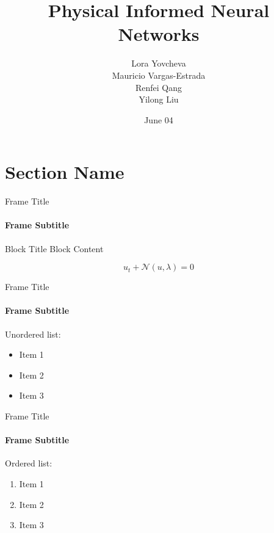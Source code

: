 \documentclass{beamer}
\title{Physical Informed Neural Networks}
\date{June 04}
\author{Lora Yovcheva\\
Mauricio Vargas-Estrada\\
Renfei Qang\\
Yilong Liu}
\begin{document}
\insertTitleSlide

\section{Section Name}

\begin{frame}{Frame Title}
\framesubtitle{Frame Subtitle} 
    \begin{block}{Block Title}
        Block Content

        \begin{equation}
            u_t + \mathcal{N}(u, \lambda) = 0
        \end{equation}
    \end{block}
\end{frame}

\begin{frame}{Frame Title}
\framesubtitle{Frame Subtitle} 

Unordered list:

\begin{itemize}
    \item Item 1
    \item Item 2
    \item Item 3
\end{itemize}
\end{frame}

\begin{frame}{Frame Title}
\framesubtitle{Frame Subtitle} 

Ordered list:

\begin{enumerate}
    \item Item 1
    \item Item 2
    \item Item 3
\end{enumerate}

\end{frame}

\insertLastSlide
\end{document}
